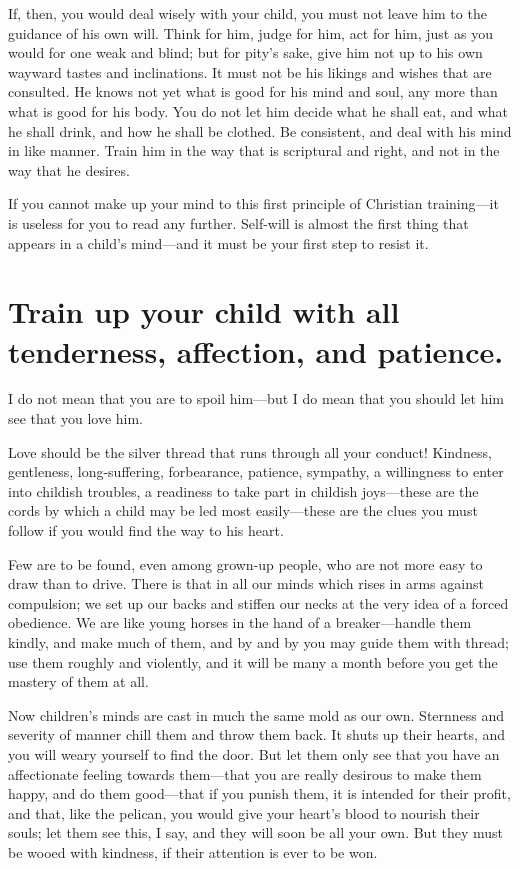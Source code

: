 \documentclass[
]{book}
\begin{document}
If, then, you would deal wisely with your child, you must not leave him to the guidance of his own will. Think for him, judge for him, act for him, just as you would for one weak and blind; but for pity's sake, give him not up to his own wayward tastes and inclinations. It must not be his likings and wishes that are consulted. He knows not yet what is good for his mind and soul, any more than what is good for his body. You do not let him decide what he shall eat, and what he shall drink, and how he shall be clothed. Be consistent, and deal with his mind in like manner. Train him in the way that is scriptural and right, and not in the way that he desires.

If you cannot make up your mind to this first principle of Christian training---it is useless for you to read any further. Self-will is almost the first thing that appears in a child's mind---and it must be your first step to resist it.

\hypertarget{train-up-your-child-with-all-tenderness-affection-and-patience.}{%
\chapter{Train up your child with all tenderness, affection, and patience.}\label{train-up-your-child-with-all-tenderness-affection-and-patience.}}

I do not mean that you are to spoil him---but I do mean that you should let him see that you love him.

Love should be the silver thread that runs through all your conduct! Kindness, gentleness, long-suffering, forbearance, patience, sympathy, a willingness to enter into childish troubles, a readiness to take part in childish joys---these are the cords by which a child may be led most easily---these are the clues you must follow if you would find the way to his heart.

Few are to be found, even among grown-up people, who are not more easy to draw than to drive. There is that in all our minds which rises in arms against compulsion; we set up our backs and stiffen our necks at the very idea of a forced obedience. We are like young horses in the hand of a breaker---handle them kindly, and make much of them, and by and by you may guide them with thread; use them roughly and violently, and it will be many a month before you get the mastery of them at all.

Now children's minds are cast in much the same mold as our own. Sternness and severity of manner chill them and throw them back. It shuts up their hearts, and you will weary yourself to find the door. But let them only see that you have an affectionate feeling towards them---that you are really desirous to make them happy, and do them good---that if you punish them, it is intended for their profit, and that, like the pelican, you would give your heart's blood to nourish their souls; let them see this, I say, and they will soon be all your own. But they must be wooed with kindness, if their attention is ever to be won.
\end{document}
